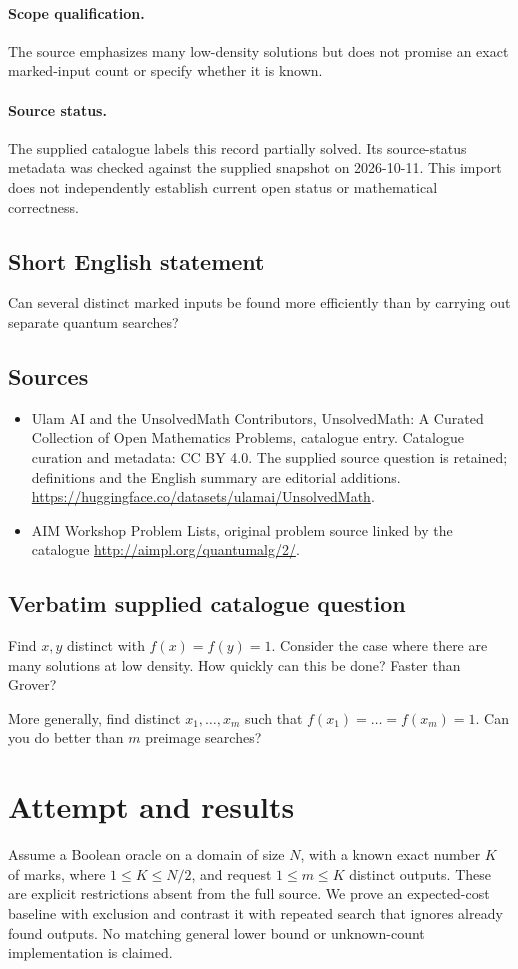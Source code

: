 \documentclass[11pt]{article}
\begin{document}
\paragraph{Scope qualification.}
The source emphasizes many low-density solutions but does not promise an exact marked-input count or specify whether it is known.
\paragraph{Source status.}
The supplied catalogue labels this record partially solved. Its source-status metadata was checked against the supplied snapshot on 2026-10-11. This import does not independently establish current open status or mathematical correctness.
\subsection{Short English statement}
Can several distinct marked inputs be found more efficiently than by carrying out separate quantum searches?
\subsection{Sources}
\begin{itemize}
\item[S1] Ulam AI and the UnsolvedMath Contributors, UnsolvedMath: A Curated Collection of Open Mathematics Problems, catalogue entry. Catalogue curation and metadata: CC BY 4.0. The supplied source question is retained; definitions and the English summary are editorial additions.
\url{https://huggingface.co/datasets/ulamai/UnsolvedMath}.
\item[S2] AIM Workshop Problem Lists, original problem source linked by the catalogue
\url{http://aimpl.org/quantumalg/2/}.
\end{itemize}
\subsection{Verbatim supplied catalogue question}
Find $x,y$ distinct with $f(x) = f(y) = 1$. Consider the case where there are many solutions at low density. How quickly can this be done? Faster than Grover?

More generally, find distinct $x_1,\dots, x_m$ such that $f(x_1) = \dots = f(x_m) = 1$. Can you do better than $m$ preimage searches?

\section{Attempt and results}
Assume a Boolean oracle on a domain of size $N$, with a known exact number
$K$ of marks, where $1\le K\le N/2$, and request $1\le m\le K$ distinct
outputs. These are explicit restrictions absent from the full source. We
prove an expected-cost baseline with exclusion and contrast it with repeated
search that ignores already found outputs. No matching general lower bound
or unknown-count implementation is claimed.
\end{document}
